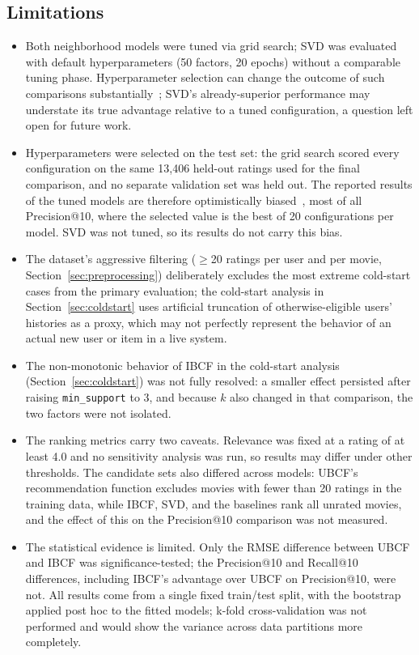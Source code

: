 \documentclass[conference]{IEEEtran}
\begin{document}
\subsection{Limitations}
\label{sec:limitations}
\begin{itemize}
\item Both neighborhood models were tuned via grid search; SVD was evaluated with default hyperparameters (50 factors, 20 epochs) without a comparable tuning phase. Hyperparameter selection can change the outcome of such comparisons substantially~\cite{rendle2020}; SVD's already-superior performance may understate its true advantage relative to a tuned configuration, a question left open for future work.
\item Hyperparameters were selected on the test set: the grid search scored every configuration on the same 13,406 held-out ratings used for the final comparison, and no separate validation set was held out. The reported results of the tuned models are therefore optimistically biased~\cite{cawley2010}, most of all Precision@10, where the selected value is the best of 20 configurations per model. SVD was not tuned, so its results do not carry this bias.
\item The dataset's aggressive filtering ($\geq$20 ratings per user and per movie, Section~\ref{sec:preprocessing}) deliberately excludes the most extreme cold-start cases from the primary evaluation; the cold-start analysis in Section~\ref{sec:coldstart} uses artificial truncation of otherwise-eligible users' histories as a proxy, which may not perfectly represent the behavior of an actual new user or item in a live system.
\item The non-monotonic behavior of IBCF in the cold-start analysis (Section~\ref{sec:coldstart}) was not fully resolved: a smaller effect persisted after raising \texttt{min\_support} to 3, and because $k$ also changed in that comparison, the two factors were not isolated.
\item The ranking metrics carry two caveats. Relevance was fixed at a rating of at least 4.0 and no sensitivity analysis was run, so results may differ under other thresholds. The candidate sets also differed across models: UBCF's recommendation function excludes movies with fewer than 20 ratings in the training data, while IBCF, SVD, and the baselines rank all unrated movies, and the effect of this on the Precision@10 comparison was not measured.
\item The statistical evidence is limited. Only the RMSE difference between UBCF and IBCF was significance-tested; the Precision@10 and Recall@10 differences, including IBCF's advantage over UBCF on Precision@10, were not. All results come from a single fixed train/test split, with the bootstrap applied post hoc to the fitted models; k-fold cross-validation was not performed and would show the variance across data partitions more completely.
\end{itemize}
\end{document}
